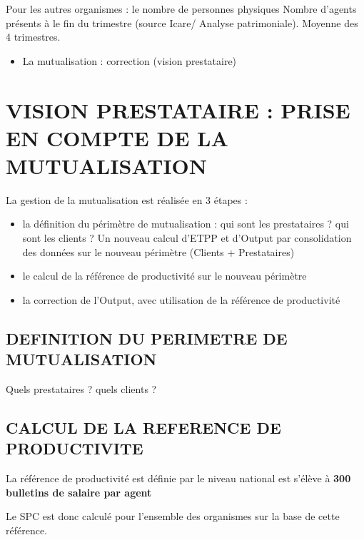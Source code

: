 \documentclass[
]{book}
\providecommand{\tightlist}{%
  \setlength{\itemsep}{0pt}\setlength{\parskip}{0pt}}
\begin{document}
Pour les autres organismes : le nombre de personnes physiques
Nombre d'agents présents à le fin du trimestre (source Icare/ Analyse patrimoniale). Moyenne des 4 trimestres.

\begin{itemize}
\tightlist
\item
  La mutualisation : correction (vision prestataire)
\end{itemize}

\hypertarget{vision-prestataire-prise-en-compte-de-la-mutualisation-5}{%
\section{VISION PRESTATAIRE : PRISE EN COMPTE DE LA MUTUALISATION}\label{vision-prestataire-prise-en-compte-de-la-mutualisation-5}}

La gestion de la mutualisation est réalisée en 3 étapes :

\begin{itemize}
\item
  la définition du périmètre de mutualisation : qui sont les prestataires ? qui sont les clients ? Un nouveau calcul d'ETPP et d'Output par consolidation des données sur le nouveau périmètre (Clients + Prestataires)
\item
  le calcul de la référence de productivité sur le nouveau périmètre
\item
  la correction de l'Output, avec utilisation de la référence de productivité
\end{itemize}

\hypertarget{definition-du-perimetre-de-mutualisation-5}{%
\subsection{DEFINITION DU PERIMETRE DE MUTUALISATION}\label{definition-du-perimetre-de-mutualisation-5}}

Quels prestataires ? quels clients ?

\hypertarget{calcul-de-la-reference-de-productivite-5}{%
\subsection{CALCUL DE LA REFERENCE DE PRODUCTIVITE}\label{calcul-de-la-reference-de-productivite-5}}

La référence de productivité est définie par le niveau national est s'élève à \textbf{300 bulletins de salaire par agent}

Le SPC est donc calculé pour l'ensemble des organismes sur la base de cette référence.
\end{document}
